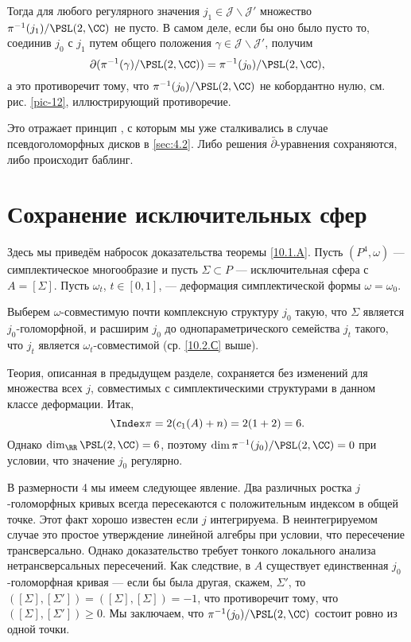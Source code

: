 Тогда для любого регулярного значения $j_1 \in \mathcal{J} \backslash \mathcal{J}'$ множество $\pi^{-1} (j_1)/\PSL(2, \CC)$ не пусто.
В самом деле, если бы оно было пусто то, соединив $j_0$ с $j_1$ путем общего положения $\gamma \in \mathcal{J} \backslash\mathcal{J}'$, получим
\[\partial(\pi^{-1}(\gamma)/\PSL(2,\CC))
=
\pi^{-1}(j_0)/\PSL(2,\CC),
\]
а это противоречит тому, что $\pi^{-1} (j_0)/\PSL(2, \CC)$ не кобордантно нулю, см. рис. \ref{pic-12}, иллюстрирующий противоречие.

Это отражает принцип , с которым мы уже сталкивались в случае псевдоголоморфных дисков в \ref{sec:4.2}.
Либо решения $\bar\partial$-уравнения сохраняются, либо происходит баблинг.

\section{Сохранение исключительных сфер}

Здесь мы приведём набросок доказательства теоремы \ref{10.1.A}.
Пусть $(P^4, \omega)$ --- симплектическое многообразие и пусть $\Sigma \subset P$ --- исключительная сфера с $A = [\Sigma]$.
Пусть $\omega_t$, $t \in [0, 1]$, --- деформация симплектической формы $\omega = \omega_0$.

Выберем $\omega$-совместимую почти комплексную структуру $j_0$ такую, что $\Sigma$ является $j_0$-голоморфной, и расширим $j_0$ до однопараметрического семейства $j_t$ такого, что $j_t$ является $\omega_t$-совместимой (ср. \ref{10.2.С} выше).

Теория, описанная в предыдущем разделе, сохраняется без изменений для множества всех $j$, совместимых с симплектическими структурами в данном классе деформации.
Итак, 
\[\Index\pi = 2(c_1 (A) + n) = 2(1 + 2) = 6.\]
Однако $\dim_\RR\PSL(2, \CC) = 6$, поэтому $\dim \pi^{-1} (j_0)/\PSL(2, \CC) = 0$ при условии, что значение $j_0$ регулярно.

В размерности 4 мы имеем следующее явление.
Два различных ростка $j$-голоморфных кривых всегда пересекаются с положительным индексом в общей точке.
Этот факт хорошо известен если $j$ интегрируема.
В неинтегрируемом случае это простое утверждение линейной алгебры при условии, что пересечение трансверсально.
Однако доказательство требует тонкого локального анализа нетрансверсальных пересечений.
Как следствие, в $A$ существует единственная $j_0$-голоморфная кривая --- если бы была другая, скажем, $\Sigma'$, то $([\Sigma], [\Sigma']) = ([\Sigma], [\Sigma]) = -1$, что противоречит тому, что $([\Sigma], [\Sigma']) \ge 0$.
Мы заключаем, что $\pi^{-1} (j_0)/\PSL(2, \CC)$ состоит ровно из одной точки.


